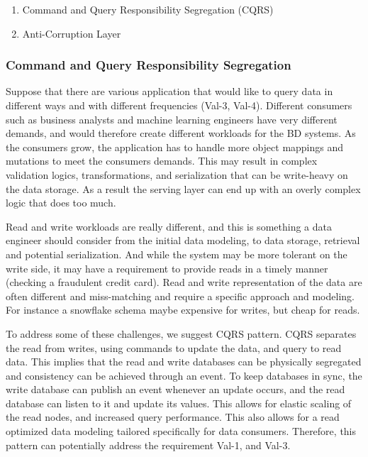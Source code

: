 \documentclass{bmcart}
\begin{document}
\begin{enumerate}
  \item Command and Query Responsibility Segregation (CQRS)
  \item  Anti-Corruption Layer
\end{enumerate}

\subsubsection{Command and Query Responsibility Segregation}

Suppose that there are various application that would like to query data in different ways and with different frequencies (Val-3, Val-4). Different consumers such as business analysts and machine learning engineers have very different demands, and would therefore create different workloads for the BD systems. As the consumers grow, the application has to handle more object mappings and mutations to meet the consumers demands. This may result in complex validation logics, transformations, and serialization that can be write-heavy on the data storage. As a result the serving layer can end up with an overly complex logic that does too much. 

Read and write workloads are really different, and this is something a data engineer should consider from the initial data modeling, to data storage, retrieval and potential serialization. And while the system may be more tolerant on the write side, it may have a requirement to provide reads in a timely manner (checking a fraudulent credit card). Read and write representation of the data are often different and miss-matching and require a specific approach and modeling. For instance a snowflake schema maybe expensive for writes, but cheap for reads. 

To address some of these challenges, we suggest CQRS pattern. CQRS separates the read from writes, using commands to update the data, and query to read data. This implies that the read and write databases can be physically segregated and consistency can be achieved through an event. To keep databases in sync, the write database can publish an event whenever an update occurs, and the read database can listen to it and update its values. This allows for elastic scaling of the read nodes, and increased query performance. This also allows for a read optimized data modeling tailored specifically for data consumers. Therefore, this pattern can potentially address the requirement Val-1, and Val-3. 
\end{document}

